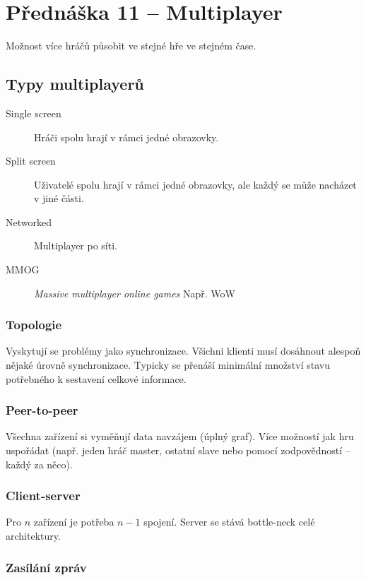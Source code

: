 \section*{Přednáška 11 -- Multiplayer}

Možnost více hráčů působit ve stejné hře ve stejném čase.

\subsection*{Typy multiplayerů}

\begin{description}
    \item[Single screen] Hráči spolu hrají v rámci jedné obrazovky.
    \item[Split screen] Uživatelé spolu hrají v rámci jedné obrazovky, ale každý se může nacházet v jiné části.
    \item[Networked] Multiplayer po síti.
    \item[MMOG] \textit{Massive multiplayer online games} Např. WoW
\end{description}

\subsubsection{Topologie}

Vyskytují se problémy jako synchronizace.
Všichni klienti musí dosáhnout alespoň nějaké úrovně synchronizace.
Typicky se přenáší minimální množství stavu potřebného k sestavení celkové informace.

\subsubsection*{Peer-to-peer}

Všechna zařízení si vyměňují data navzájem (úplný graf).
Více možností jak hru uspořádat (např. jeden hráč master, ostatní slave nebo pomocí zodpovědností -- každý za něco).

\subsubsection*{Client-server}

Pro \(n\) zařízení je potřeba \(n-1\) spojení.
Server se stává bottle-neck celé architektury.

\subsubsection*{Zasílání zpráv}

